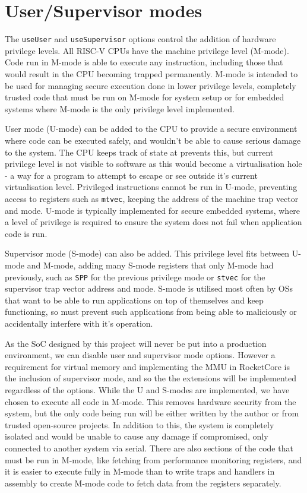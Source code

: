 \section{User/Supervisor modes}
The \texttt{useUser} and \texttt{useSupervisor} options control the addition of hardware privilege levels. All RISC-V CPUs have the machine privilege level (M-mode). Code run in M-mode is able to execute any instruction, including those that would result in the CPU becoming trapped permanently. M-mode is intended to be used for managing secure execution done in lower privilege levels, completely trusted code that must be run on M-mode for system setup or for embedded systems where M-mode is the only privilege level implemented.

User mode (U-mode) can be added to the CPU to provide a secure environment where code can be executed safely, and wouldn't be able to cause serious damage to the system. The CPU keeps track of state at prevents this, but current privilege level is not visible to software as this would become a virtualisation hole - a way for a program to attempt to escape or see outside it's current virtualisation level. Privileged instructions cannot be run in U-mode, preventing access to registers such as \texttt{mtvec}, keeping the address of the machine trap vector and mode. U-mode is typically implemented for secure embedded systems, where a level of privilege is required to ensure the system does not fail when application code is run.

Supervisor mode (S-mode) can also be added. This privilege level fits between U-mode and M-mode, adding many S-mode registers that only M-mode had previously, such as \texttt{SPP} for the previous privilege mode or \texttt{stvec} for the supervisor trap vector address and mode. S-mode is utilised most often by OSs that want to be able to run applications on top of themselves and keep functioning, so must prevent such applications from being able to maliciously or accidentally interfere with it's operation.

As the SoC designed by this project will never be put into a production environment, we can disable user and supervisor mode options. However a requirement for virtual memory and implementing the MMU in RocketCore is the inclusion of supervisor mode, and so the the extensions will be implemented regardless of the options. While the U and S-modes are implemented, we have chosen to execute all code in M-mode. This removes hardware security from the system, but the only code being run will be either written by the author or from trusted open-source projects. In addition to this, the system is completely isolated and would be unable to cause any damage if compromised, only connected to another system via serial. There are also sections of the code that must be run in M-mode, like fetching from performance monitoring registers, and it is easier to execute fully in M-mode than to write traps and handlers in assembly to create M-mode code to fetch data from the registers separately.

